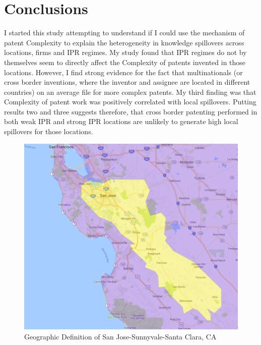 \documentclass[12pt]{article}
\begin{document}
\section{Conclusions}
I started this study attempting to understand if I could use the mechanism of patent Complexity to explain the heterogeneity in knowledge spillovers across locations, firms and IPR regimes. My study found that IPR regimes do not by themselves seem to directly affect the Complexity of patents invented in those locations. However, I find strong evidence for the fact that multinationals (or cross border inventions, where the inventor and assignee are located in different countries) on an average file for more complex patents. My third finding was that Complexity of patent work was positively correlated with local spillovers. Putting results two and three suggests therefore, that cross border patenting performed in both weak IPR and strong IPR locations are unlikely to generate high local spillovers for those locations. 

\singlespacing
 



\appendix
\begin{figure}[h]
\begin{centering}
  \includegraphics[width=\textwidth]{SanJose}
  \caption{Geographic Definition of San Jose-Sunnyvale-Santa Clara, CA}
   \label{fig:SanJose}
\end{centering}
\end{figure}
\end{document}
